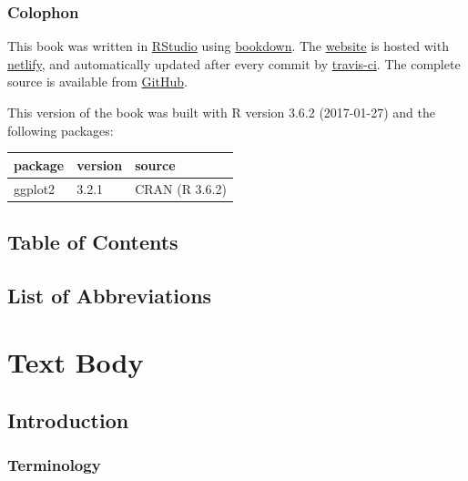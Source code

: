 \documentclass[]{book}
\begin{document}
\hypertarget{colophon}{%
\section*{Colophon}\label{colophon}}

This book was written in \href{http://www.rstudio.com/ide/}{RStudio} using
\href{http://bookdown.org/}{bookdown}. The \href{http://mastering-shiny.org/}{website} is
hosted with \href{http://netlify.com/}{netlify}, and automatically updated after
every commit by \href{https://travis-ci.org/}{travis-ci}. The complete source is
available from \href{https://github.com/Kiwi-Random-House/template.book}{GitHub}.

This version of the book was built with R version 3.6.2 (2017-01-27) and the following
packages:

\begin{longtable}[]{@{}lll@{}}
\toprule
package & version & source\tabularnewline
\midrule
\endhead
ggplot2 & 3.2.1 & CRAN (R 3.6.2)\tabularnewline
\bottomrule
\end{longtable}

\hypertarget{table-of-contents}{%
\chapter*{Table of Contents}\label{table-of-contents}}

\hypertarget{list-of-abbreviations}{%
\chapter*{List of Abbreviations}\label{list-of-abbreviations}}

\hypertarget{part-text-body}{%
\part*{Text Body}\label{part-text-body}}

\hypertarget{intro}{%
\chapter{Introduction}\label{intro}}

\hypertarget{terminology}{%
\section{Terminology}\label{terminology}}
\end{document}
